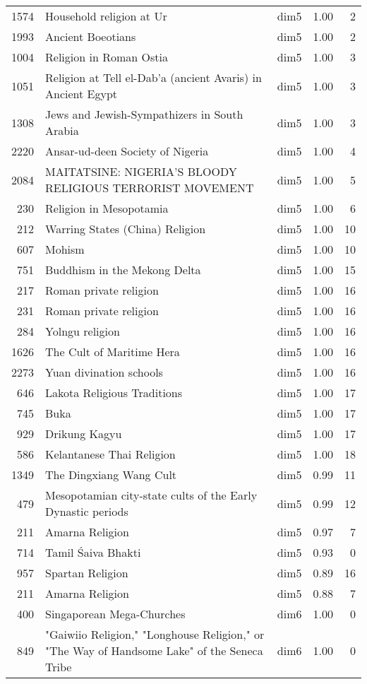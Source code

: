 \begin{tabular}{rllrr}
1574 & Household religion at Ur & dim5 & 1.00 & 2 \\
1993 & Ancient Boeotians & dim5 & 1.00 & 2 \\
1004 & Religion in Roman Ostia & dim5 & 1.00 & 3 \\
1051 & Religion at Tell el-Dab'a (ancient Avaris) in Ancient Egypt & dim5 & 1.00 & 3 \\
1308 & Jews and Jewish-Sympathizers in South Arabia & dim5 & 1.00 & 3 \\
2220 & Ansar-ud-deen Society of Nigeria & dim5 & 1.00 & 4 \\
2084 & MAITATSINE: NIGERIA'S BLOODY RELIGIOUS TERRORIST MOVEMENT & dim5 & 1.00 & 5 \\
230 & Religion in Mesopotamia & dim5 & 1.00 & 6 \\
212 & Warring States (China) Religion & dim5 & 1.00 & 10 \\
607 & Mohism & dim5 & 1.00 & 10 \\
751 & Buddhism in the Mekong Delta & dim5 & 1.00 & 15 \\
217 & Roman private religion & dim5 & 1.00 & 16 \\
231 & Roman private religion & dim5 & 1.00 & 16 \\
284 & Yolngu religion & dim5 & 1.00 & 16 \\
1626 & The Cult of Maritime Hera & dim5 & 1.00 & 16 \\
2273 & Yuan divination schools & dim5 & 1.00 & 16 \\
646 & Lakota Religious Traditions & dim5 & 1.00 & 17 \\
745 & Buka & dim5 & 1.00 & 17 \\
929 & Drikung Kagyu & dim5 & 1.00 & 17 \\
586 & Kelantanese Thai Religion & dim5 & 1.00 & 18 \\
1349 & The Dingxiang Wang Cult & dim5 & 0.99 & 11 \\
479 & Mesopotamian city-state cults of the Early Dynastic periods & dim5 & 0.99 & 12 \\
211 & Amarna Religion & dim5 & 0.97 & 7 \\
714 & Tamil Śaiva Bhakti & dim5 & 0.93 & 0 \\
957 & Spartan Religion & dim5 & 0.89 & 16 \\
211 & Amarna Religion & dim5 & 0.88 & 7 \\
400 & Singaporean Mega-Churches & dim6 & 1.00 & 0 \\
849 & "Gaiwiio Religion," "Longhouse Religion," or "The Way of Handsome Lake" of the Seneca Tribe & dim6 & 1.00 & 0 \\

\end{tabular}

